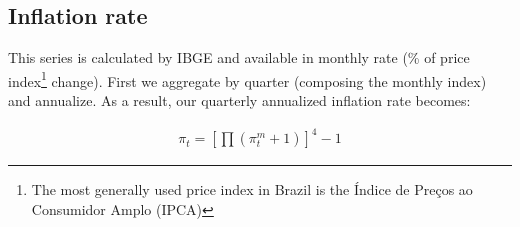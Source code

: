 \subsection{Inflation rate}
This series is calculated by IBGE and available in monthly rate (\% of price index\footnote{The most generally used price index in Brazil is the Índice de Preços ao Consumidor Amplo (IPCA)} change). First we aggregate by quarter (composing the monthly index) and annualize. As a result, our quarterly annualized inflation rate becomes:

\begin{align}
\pi_t = \left[\prod(\pi_t^m+1)\right]^{4}-1

\end{align}

